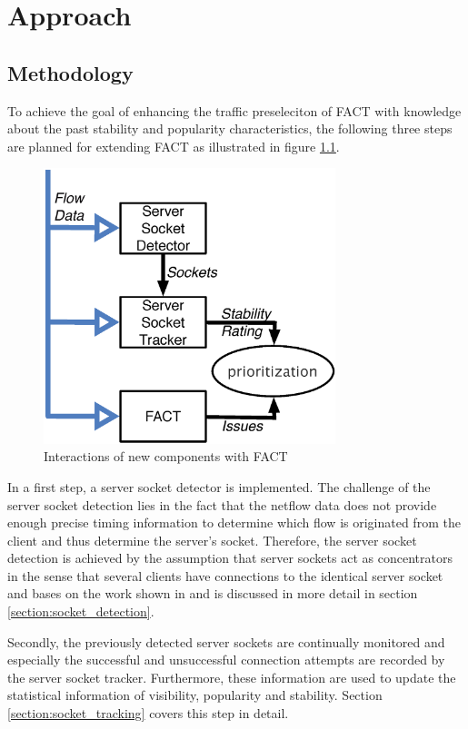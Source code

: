 

\chapter{Approach
\label{chapter:approach}}

\section{Methodology
\label{section:methodology}}

To achieve the goal of enhancing the traffic preseleciton of FACT with
knowledge about the past stability and popularity characteristics, the following
three steps are planned for extending FACT as illustrated in figure
\ref{fig:FACT}.
\begin{figure}
	[ht] \centering
	\includegraphics[width=8.5cm]{images/Approach_blockdiagram.eps}
	\caption{Interactions of new components with FACT} 
	\label{fig:FACT} 
\end{figure}

In a first step, a server socket detector is implemented. The challenge of the
server socket detection lies in the fact that the netflow data does not provide
enough precise timing information to determine which flow is originated from the
client and thus determine the server's socket. Therefore, the server socket
detection is achieved by the assumption that server sockets act as concentrators
in the sense that several clients have connections to the identical server
socket and bases on the work shown in
\cite{Schatzmann:Dissection,Schatzmann:Mining,Schatzmann:Tracing} and is
discussed in more detail in section \ref{section:socket_detection}.

Secondly, the previously detected server sockets are continually monitored and
especially the successful and unsuccessful connection attempts are recorded by
the server socket tracker.
Furthermore, these information are used to update the statistical information of
visibility, popularity and stability. Section \ref{section:socket_tracking}
covers this step in detail.


